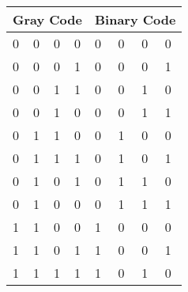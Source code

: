 \documentclass[11pt]{article}
\begin{document}
	\begin{table}[]
		\begin{tabular}{|llll|llll|}
		\hline
		\multicolumn{4}{|l|}{\textbf{Gray Code}}                                      & \multicolumn{4}{l|}{\textbf{Binary Code}}                                    \\ \hline
		\multicolumn{1}{|l|}{0} & \multicolumn{1}{l|}{0} & \multicolumn{1}{l|}{0} & 0 & \multicolumn{1}{l|}{0} & \multicolumn{1}{l|}{0} & \multicolumn{1}{l|}{0} & 0 \\ \hline
		\multicolumn{1}{|l|}{0} & \multicolumn{1}{l|}{0} & \multicolumn{1}{l|}{0} & 1 & \multicolumn{1}{l|}{0} & \multicolumn{1}{l|}{0} & \multicolumn{1}{l|}{0} & 1 \\ \hline
		\multicolumn{1}{|l|}{0} & \multicolumn{1}{l|}{0} & \multicolumn{1}{l|}{1} & 1 & \multicolumn{1}{l|}{0} & \multicolumn{1}{l|}{0} & \multicolumn{1}{l|}{1} & 0 \\ \hline
		\multicolumn{1}{|l|}{0} & \multicolumn{1}{l|}{0} & \multicolumn{1}{l|}{1} & 0 & \multicolumn{1}{l|}{0} & \multicolumn{1}{l|}{0} & \multicolumn{1}{l|}{1} & 1 \\ \hline
		\multicolumn{1}{|l|}{0} & \multicolumn{1}{l|}{1} & \multicolumn{1}{l|}{1} & 0 & \multicolumn{1}{l|}{0} & \multicolumn{1}{l|}{1} & \multicolumn{1}{l|}{0} & 0 \\ \hline
		\multicolumn{1}{|l|}{0} & \multicolumn{1}{l|}{1} & \multicolumn{1}{l|}{1} & 1 & \multicolumn{1}{l|}{0} & \multicolumn{1}{l|}{1} & \multicolumn{1}{l|}{0} & 1 \\ \hline
		\multicolumn{1}{|l|}{0} & \multicolumn{1}{l|}{1} & \multicolumn{1}{l|}{0} & 1 & \multicolumn{1}{l|}{0} & \multicolumn{1}{l|}{1} & \multicolumn{1}{l|}{1} & 0 \\ \hline
		\multicolumn{1}{|l|}{0} & \multicolumn{1}{l|}{1} & \multicolumn{1}{l|}{0} & 0 & \multicolumn{1}{l|}{0} & \multicolumn{1}{l|}{1} & \multicolumn{1}{l|}{1} & 1 \\ \hline
		\multicolumn{1}{|l|}{1} & \multicolumn{1}{l|}{1} & \multicolumn{1}{l|}{0} & 0 & \multicolumn{1}{l|}{1} & \multicolumn{1}{l|}{0} & \multicolumn{1}{l|}{0} & 0 \\ \hline
		\multicolumn{1}{|l|}{1} & \multicolumn{1}{l|}{1} & \multicolumn{1}{l|}{0} & 1 & \multicolumn{1}{l|}{1} & \multicolumn{1}{l|}{0} & \multicolumn{1}{l|}{0} & 1 \\ \hline
		\multicolumn{1}{|l|}{1} & \multicolumn{1}{l|}{1} & \multicolumn{1}{l|}{1} & 1 & \multicolumn{1}{l|}{1} & \multicolumn{1}{l|}{0} & \multicolumn{1}{l|}{1} & 0 \\ \hline

\end{tabular}
\end{table}
\end{document}
